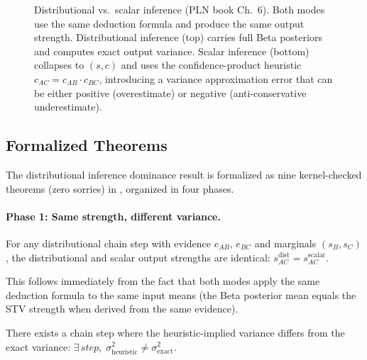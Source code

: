 \documentclass[11pt,openany]{report}
\begin{document}
\begin{figure}[htbp]
\caption{Distributional vs.\ scalar inference (PLN book Ch.~6).  Both modes
use the same deduction formula and produce the same output strength.
Distributional inference (top) carries full Beta posteriors and computes
exact output variance.  Scalar inference (bottom) collapses to $(s, c)$ and
uses the confidence-product heuristic $c_{AC} = c_{AB} \cdot c_{BC}$,
introducing a variance approximation error that can be either positive
(overestimate) or negative (anti-conservative underestimate).}
\label{fig:distributional-vs-scalar}
\end{figure}

\subsection*{Formalized Theorems}

The distributional inference dominance result is formalized as nine
kernel-checked theorems (zero sorries) in
, organized
in four phases.

\paragraph{Phase 1: Same strength, different variance.}
\begin{theorem}
\label{thm:same-strength-one-step}
For any distributional chain step with evidence $e_{AB}$, $e_{BC}$ and
marginals $(s_B, s_C)$, the distributional and scalar output strengths
are identical:
$s^{\mathrm{dist}}_{AC} = s^{\mathrm{scalar}}_{AC}$.
\end{theorem}
This follows immediately from the fact that both modes apply the same
deduction formula to the same input means (the Beta posterior mean equals
the STV strength when derived from the same evidence).

\begin{theorem}
\label{thm:heuristic-variance-ne-exact}
There exists a chain step where the heuristic-implied variance differs from
the exact variance:
$\exists\, \mathit{step},\; \sigma^2_{\mathrm{heuristic}} \ne \sigma^2_{\mathrm{exact}}$.
\end{theorem}
\end{document}
